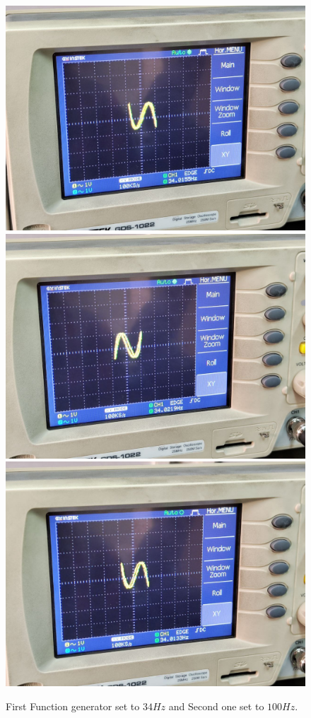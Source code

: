 \documentclass[11pt]{article}
\begin{document}
\begin{question}
{        \begin{figure}[H]
            \begin{center}
                \includegraphics[scale=0.1]{Fig/68.jpeg}
                \includegraphics[scale=0.1]{Fig/69.jpeg}
                \includegraphics[scale=0.1]{Fig/70.jpeg}
                \caption{First Function generator set to $34Hz$ and Second one set to $100Hz$.}
            \end{center}
        \end{figure}

}
\end{question}
\end{document}
